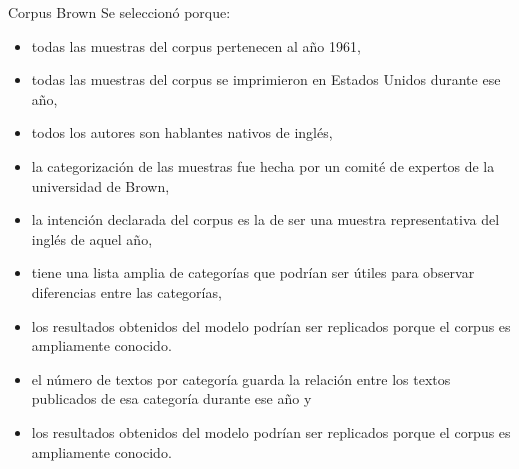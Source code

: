 \documentclass[presentation]{beamer}
\begin{document}
\begin{frame}[label={sec:org26dacc9}]{Corpus Brown}
Se seleccionó porque:
\small
\begin{itemize}
\item todas las muestras del corpus pertenecen al año 1961,
\item todas las muestras del corpus se imprimieron en Estados Unidos durante ese año,
\item todos los autores son hablantes nativos de inglés,
\item la categorización de las muestras fue hecha por un comité de expertos de la universidad de Brown,
\item la intención declarada del corpus es la de ser una muestra representativa del inglés de aquel año,
\item tiene una lista amplia de categorías que podrían ser útiles para observar diferencias entre las categorías,
\item los resultados obtenidos del modelo podrían ser replicados porque el corpus es ampliamente conocido.
\item el número de textos por categoría guarda la relación entre los textos publicados de esa categoría durante ese año y
\item los resultados obtenidos del modelo podrían ser replicados porque el corpus es ampliamente conocido.
\end{itemize}
\normalsize
\end{frame}
\end{document}
